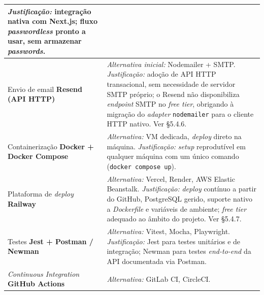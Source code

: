 \documentclass[11pt,a4paper]{article}
\begin{document}
\begin{table}[H]
\begin{tabularx}{\linewidth}{@{}>{\raggedright\arraybackslash}p{4.6cm}X@{}}
        \textit{Justificação:} integração nativa com Next.js; fluxo \emph{passwordless} pronto a usar, sem armazenar \emph{passwords}.                  \\
        \midrule
        Envio de email \newline \textbf{Resend (API HTTP)}                                               & \textit{Alternativa inicial:} Nodemailer + SMTP. \newline
        \textit{Justificação:} adoção de API HTTP transacional, sem necessidade de servidor SMTP próprio; o Resend não disponibiliza \emph{endpoint} SMTP no \emph{free tier}, obrigando à migração do \emph{adapter} \texttt{nodemailer} para o cliente HTTP nativo. Ver \S5.4.6.                                                                                                                                       \\
        \midrule
        Containerização \newline \textbf{Docker + Docker Compose}                                        & \textit{Alternativa:} VM dedicada, \emph{deploy} direto na máquina. \newline
        \textit{Justificação:} \emph{setup} reprodutível em qualquer máquina com um único comando (\texttt{docker compose up}).                         \\
        \midrule
        Plataforma de \emph{deploy} \newline \textbf{Railway}                                            & \textit{Alternativa:} Vercel, Render, AWS Elastic Beanstalk. \newline
        \textit{Justificação:} \emph{deploy} contínuo a partir do GitHub, PostgreSQL gerido, suporte nativo a \emph{Dockerfile} e variáveis de ambiente; \emph{free tier} adequado ao âmbito do projeto. Ver \S5.4.7.                                          \\
        \midrule
        Testes \newline \textbf{Jest + Postman / Newman}                                                 & \textit{Alternativa:} Vitest, Mocha, Playwright. \newline
        \textit{Justificação:} Jest para testes unitários e de integração; Newman para testes \emph{end-to-end} da API documentada via Postman.         \\
        \midrule
        \emph{Continuous Integration} \newline \textbf{GitHub Actions}                                   & \textit{Alternativa:} GitLab CI, CircleCI. \newline

\end{tabularx}
\end{table}
\end{document}
